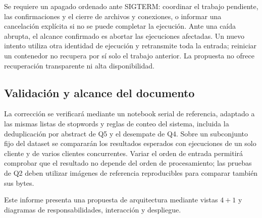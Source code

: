 Se requiere un apagado ordenado ante SIGTERM: coordinar el trabajo pendiente,
las confirmaciones y el cierre de archivos y conexiones, o informar una
cancelación explícita si no se puede completar la ejecución. Ante una caída
abrupta, el alcance confirmado es abortar las ejecuciones afectadas. Un nuevo
intento utiliza otra identidad de ejecución y retransmite toda la entrada;
reiniciar un contenedor no recupera por sí solo el trabajo anterior.
La propuesta no ofrece recuperación transparente ni alta disponibilidad.

\subsection{Validación y alcance del documento}

La corrección se verificará mediante un notebook serial de referencia,
adaptado a las mismas listas de stopwords y reglas de conteo del sistema,
incluida la deduplicación por abstract de Q5 y el desempate de Q4.
Sobre un subconjunto fijo del dataset se compararán los resultados esperados
con ejecuciones de un solo cliente y de varios clientes concurrentes.
Variar el orden de entrada permitirá comprobar que el resultado no depende
del orden de procesamiento; las pruebas de Q2 deben utilizar imágenes de
referencia reproducibles para comparar también sus bytes.

Este informe presenta una propuesta de arquitectura mediante vistas $4+1$ y
diagramas de responsabilidades, interacción y despliegue.

